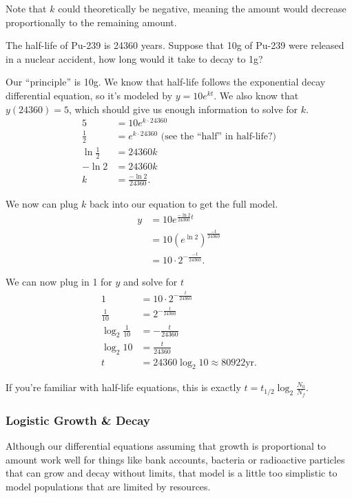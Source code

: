 Note that $k$ could theoretically be negative, meaning the amount would decrease proportionally to the remaining amount.
\begin{example}
	The half-life of Pu-239 is 24360 years.
	Suppose that 10g of Pu-239 were released in a nuclear accident, how long would it take to decay to 1g?
\end{example}
\begin{answer}
	Our ``principle'' is 10g.
	We know that half-life follows the exponential decay differential equation, so it's modeled by $y = 10e^{kt}$.
	We also know that $y(24360)=5$, which should give us enough information to solve for $k$.
	\begin{align*}
		5 &= 10e^{k\cdot 24360} \\
		\frac{1}{2} &= e^{k\cdot 24360} \text{ (see the ``half'' in half-life?)} \\
		\ln{\frac{1}{2}} &= 24360k \\
		-\ln{2} &= 24360k \\
		k &= \frac{-\ln{2}}{24360}.
	\end{align*}
	
	We now can plug $k$ back into our equation to get the full model.
	\begin{align*}
		y &= 10e^{\frac{-\ln{2}}{24360}t} \\
		&= 10\left(e^{\ln{2}}\right)^{\frac{-t}{24360}} \\
		&= 10\cdot2^{-\frac{-t}{24360}}.
	\end{align*}
	
	We can now plug in 1 for $y$ and solve for $t$
	\begin{align*}
		1 &= 10\cdot2^{-\frac{t}{24360}} \\
		\frac{1}{10} &= 2^{-\frac{t}{24360}} \\
		\log_{2}{\frac{1}{10}} &= -\frac{t}{24360} \\
		\log_{2}{10} &= \frac{t}{24360} \\
		t &= 24360\log_{2}{10} \approx 80922\text{yr}.
	\end{align*}
	
	If you're familiar with half-life equations, this is exactly $t=t_{1/2}\log_{2}{\frac{N_0}{N_f}}$.
\end{answer}

\subsubsection{Logistic Growth \& Decay}
Although our differential equations assuming that growth is proportional to amount work well for things like bank accounts, bacteria or radioactive particles that can grow and decay without limits, that model is a little too simplistic to model populations that are limited by resources.

